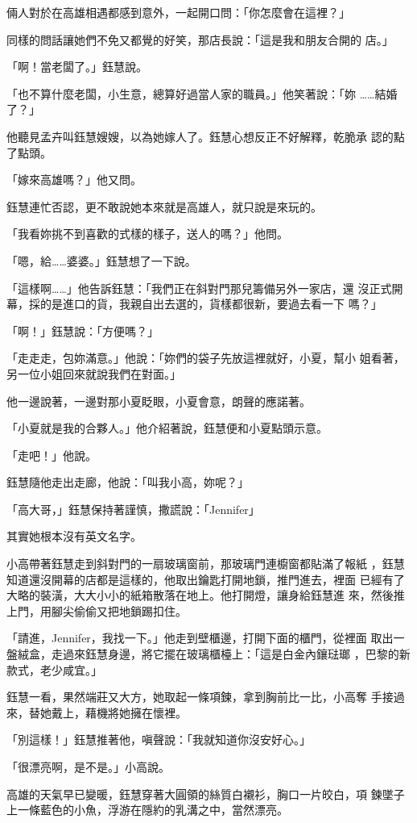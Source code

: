 倆人對於在高雄相遇都感到意外，一起開口問：「你怎麼會在這裡？」

同樣的問話讓她們不免又都覺的好笑，那店長說：「這是我和朋友合開的
店。」

「啊！當老闆了。」鈺慧說。

「也不算什麼老闆，小生意，總算好過當人家的職員。」他笑著說：「妳
……結婚了？」

他聽見孟卉叫鈺慧嫂嫂，以為她嫁人了。鈺慧心想反正不好解釋，乾脆承
認的點了點頭。

「嫁來高雄嗎？」他又問。

鈺慧連忙否認，更不敢說她本來就是高雄人，就只說是來玩的。

「我看妳挑不到喜歡的式樣的樣子，送人的嗎？」他問。

「嗯，給……婆婆。」鈺慧想了一下說。

「這樣啊……」他告訴鈺慧：「我們正在斜對門那兒籌備另外一家店，還
沒正式開幕，採的是進口的貨，我親自出去選的，貨樣都很新，要過去看一下
嗎？」

「啊！」鈺慧說：「方便嗎？」

「走走走，包妳滿意。」他說：「妳們的袋子先放這裡就好，小夏，幫小
姐看著，另一位小姐回來就說我們在對面。」

他一邊說著，一邊對那小夏眨眼，小夏會意，朗聲的應諾著。

「小夏就是我的合夥人。」他介紹著說，鈺慧便和小夏點頭示意。

「走吧！」他說。

鈺慧隨他走出走廊，他說：「叫我小高，妳呢？」

「高大哥，」鈺慧保持著謹慎，撒謊說：「Jennifer」

其實她根本沒有英文名字。

小高帶著鈺慧走到斜對門的一扇玻璃窗前，那玻璃門連櫥窗都貼滿了報紙
，鈺慧知道還沒開幕的店都是這樣的，他取出鑰匙打開地鎖，推門進去，裡面
已經有了大略的裝潢，大大小小的紙箱散落在地上。他打開燈，讓身給鈺慧進
來，然後推上門，用腳尖偷偷又把地鎖踢扣住。

「請進，Jennifer，我找一下。」他走到壁櫃邊，打開下面的櫃門，從裡面
取出一盤絨盒，走過來鈺慧身邊，將它擺在玻璃櫃檯上：「這是白金內鑲琺瑯
，巴黎的新款式，老少咸宜。」

鈺慧一看，果然端莊又大方，她取起一條項鍊，拿到胸前比一比，小高奪
手接過來，替她戴上，藉機將她擁在懷裡。

「別這樣！」鈺慧推著他，嗔聲說：「我就知道你沒安好心。」

「很漂亮啊，是不是。」小高說。

高雄的天氣早已變暖，鈺慧穿著大圓領的絲質白襯衫，胸口一片皎白，項
鍊墜子上一條藍色的小魚，浮游在隱約的乳溝之中，當然漂亮。

